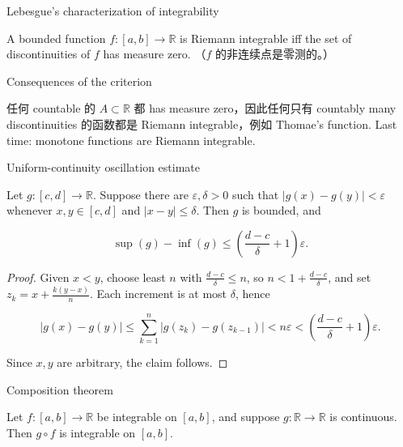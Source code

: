 \begin{theorem}{Lebesgue's characterization of integrability}

A bounded function \(f:\left\lbrack {a,b} \right\rbrack\rightarrow\mathbb{R}\) is Riemann integrable iff the set of discontinuities of \(f\) has measure zero. （\(f\) 的非连续点是零测的。）

\end{theorem}

\begin{qlremark}{Consequences of the criterion}

任何 countable 的 \(A \subset \mathbb{R}\) 都 has measure zero，因此任何只有 countably many discontinuities 的函数都是 Riemann integrable，例如 Thomae's function. Last time: monotone functions are Riemann integrable.

\end{qlremark}

\begin{lemma}{Uniform-continuity oscillation estimate}

Let \(g:\left\lbrack {c,d} \right\rbrack\rightarrow\mathbb{R}\). Suppose there are \(\varepsilon,\delta > 0\) such that \(\left| {g(x) - g(y)} \right| < \varepsilon\) whenever \(x,y \in \left\lbrack {c,d} \right\rbrack\) and \(\left| {x - y} \right| \leq \delta\). Then \(g\) is bounded, and

\[\sup(g) - \inf(g) \leq \left( {\frac{d - c}{\delta} + 1} \right)\varepsilon.\]

\end{lemma}

\begin{proof}

Given \(x < y\), choose least \(n\) with \(\frac{d - c}{\delta} \leq n\), so \(n < 1 + \frac{d - c}{\delta}\), and set \(z_{k} = x + \frac{k\left( {y - x} \right)}{n}\). Each increment is at most \(\delta\), hence

\[\left| {g(x) - g(y)} \right| \leq \sum\limits_{k = 1}^{n}\left| {g\left( z_{k} \right) - g\left( z_{k - 1} \right)} \right| < n\varepsilon < \left( {\frac{d - c}{\delta} + 1} \right)\varepsilon.\]

Since \(x,y\) are arbitrary, the claim follows.

\end{proof}

\begin{theorem}{Composition theorem}

Let \(f:\left\lbrack {a,b} \right\rbrack\rightarrow\mathbb{R}\) be integrable on \(\left\lbrack {a,b} \right\rbrack\), and suppose \(g:\mathbb{R}\rightarrow\mathbb{R}\) is continuous. Then \(g \circ f\) is integrable on \(\left\lbrack {a,b} \right\rbrack\).

\end{theorem}

